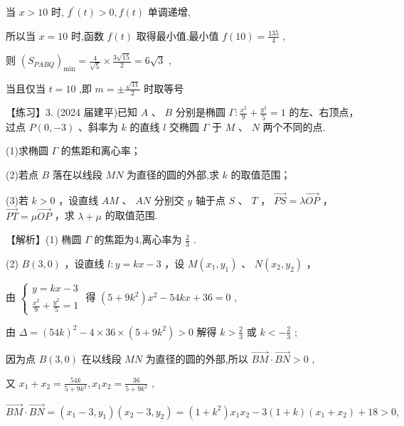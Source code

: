 \documentclass[10pt]{article}
\newcommand*\circled[1]{\tikz[baseline=(char.base)]{\node[shape=circle,draw,inner sep=1.5pt] (char) {\small #1};}}
\begin{document}
当 \(x > {10}\) 时, \({f}^{\prime }\left( t\right)  > 0,f\left( t\right)\) 单调递增,

所以当 \(x = {10}\) 时,函数 \(f\left( t\right)\) 取得最小值,最小值 \(f\left( {10}\right)  = \frac{135}{4}\) ,

则 \({\left( {S}_{PABQ}\right) }_{\min } = \frac{4}{\sqrt{5}} \times  \frac{3\sqrt{15}}{2} = 6\sqrt{3}\) ,

当且仅当 \(t = {10}\) ,即 \(m =  \pm  \frac{\sqrt{11}}{2}\) 时取等号

【练习】3. (2024 届建平)已知 \(A\) 、 \(B\) 分别是椭圆 \(\Gamma  : \frac{{x}^{2}}{9} + \frac{{y}^{2}}{5} = 1\) 的左、右顶点，过点 \(P\left( {0, - 3}\right)\) 、斜率为 \(k\) 的直线 \(l\) 交椭圆 \(\Gamma\) 于 \(M\) 、 \(N\) 两个不同的点.

(1)求椭圆 \(\Gamma\) 的焦距和离心率；

(2)若点 \(B\) 落在以线段 \({MN}\) 为直径的圆的外部,求 \(k\) 的取值范围；

(3)若 \(k > 0\) ，设直线 \({AM}\) 、 \({AN}\) 分别交 \(y\) 轴于点 \(S\) 、 \(T\) ， \(\overrightarrow{PS} = \lambda \overrightarrow{OP}\) ， \(\overrightarrow{PT} = \mu \overrightarrow{OP}\) ，求 \(\lambda  + \mu\) 的取值范围.

【解析】(1) 椭圆 \(\Gamma\) 的焦距为4,离心率为 \(\frac{2}{3}\) .

(2) \(B\left( {3,0}\right)\) ，设直线 \(l : y = {kx} - 3\) ，设 \(M\left( {{x}_{1},{y}_{1}}\right)\) 、 \(N\left( {{x}_{2},{y}_{2}}\right)\) ，

由 \(\left\{  \begin{matrix} y = {kx} - 3 \\  \frac{{x}^{2}}{9} + \frac{{y}^{2}}{5} = 1 \end{matrix}\right.\) 得 \(\left( {5 + 9{k}^{2}}\right) {x}^{2} - {54kx} + {36} = 0\) ,

由 \(\Delta  = {\left( {54}k\right) }^{2} - 4 \times  {36} \times  \left( {5 + 9{k}^{2}}\right)  > 0\) 解得 \(k > \frac{2}{3}\) 或 \(k <  - \frac{2}{3}\)  \circled{1} ;

因为点 \(B\left( {3,0}\right)\) 在以线段 \({MN}\) 为直径的圆的外部,所以 \(\overrightarrow{BM} \cdot  \overrightarrow{BN} > 0\) ,

又 \({x}_{1} + {x}_{2} = \frac{54k}{5 + 9{k}^{2}},{x}_{1}{x}_{2} = \frac{36}{5 + 9{k}^{2}}\) ,

\(\overrightarrow{BM} \cdot  \overrightarrow{BN} = \left( {{x}_{1} - 3,{y}_{1}}\right) \left( {{x}_{2} - 3,{y}_{2}}\right)  = \left( {1 + {k}^{2}}\right) {x}_{1}{x}_{2} - 3\left( {1 + k}\right) \left( {{x}_{1} + {x}_{2}}\right)  + {18} > 0,\)
\end{document}
